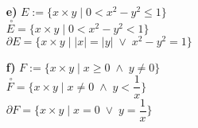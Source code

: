 \documentclass[10pt,a4paper]{article}
\theoremstyle{definition} \newtheorem{teo}{Teorem}
\begin{document}
\begin{enumerate}
\begin{enumerate}
\item[\textbf{e)}]
$ E:= \{x\times y \mid  0 < x^{2}-y^{2}\leqslant 1 \}$\\
$ \stackrel{\;\circ}{E}=\{x\times y \mid  0< {x^{2} - y^{2}}< 1 \}$\\
$ \partial E=\{x\times y \mid  |x|=|y| \; \vee\; x^{2}-y^{2}=1 \} $

\item[\textbf{f)}]
$ F:= \{x\times y \mid x\geq 0\; \wedge \; y\neq 0\}$\\
$ \stackrel{\;\circ}{F}=\{x\times y \mid  x\neq 0\; \wedge\; y<\dfrac{1}{x} \}$\\
$ \partial F=\{x\times y \mid x=0\; \vee\; y=\dfrac{1}{x} \} $

\end{enumerate}


\end{enumerate}
\end{document}
